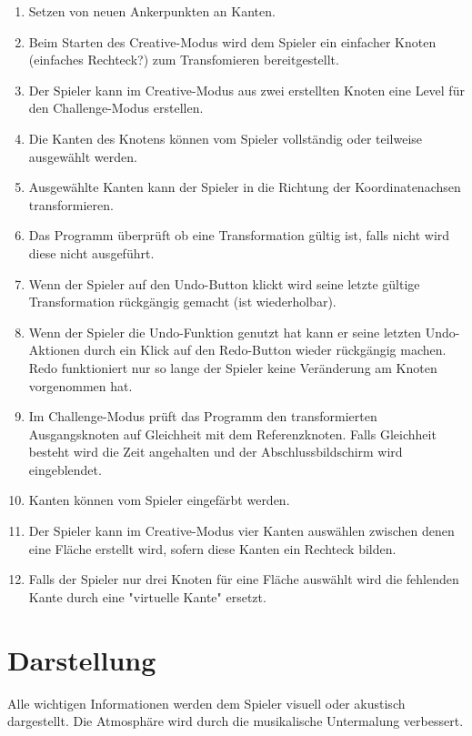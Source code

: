 \begin{enumerate}[resume]
\item Setzen von neuen Ankerpunkten an Kanten. %
\item Beim Starten des Creative-Modus wird dem Spieler ein einfacher Knoten (einfaches Rechteck?) zum Transfomieren bereitgestellt.
\item Der Spieler kann im Creative-Modus aus zwei erstellten Knoten eine Level für den Challenge-Modus erstellen.
\item Die Kanten des Knotens können vom Spieler vollständig oder teilweise ausgewählt werden.
\item Ausgewählte Kanten kann der Spieler in die Richtung der Koordinatenachsen transformieren.
\item Das Programm überprüft ob eine Transformation gültig ist, falls nicht wird diese nicht ausgeführt.
\item Wenn der Spieler auf den Undo-Button klickt wird seine letzte gültige Transformation rückgängig gemacht (ist wiederholbar).
\item Wenn der Spieler die Undo-Funktion genutzt hat kann er seine letzten Undo-Aktionen durch ein Klick auf den Redo-Button wieder rückgängig machen. Redo funktioniert nur so lange der Spieler keine Veränderung am Knoten vorgenommen hat.
\item Im Challenge-Modus prüft das Programm den transformierten Ausgangsknoten auf Gleichheit mit dem Referenzknoten. Falls Gleichheit besteht wird die Zeit angehalten und der Abschlussbildschirm wird eingeblendet.
\item Kanten können vom Spieler eingefärbt werden.
\item Der Spieler kann im Creative-Modus vier Kanten auswählen zwischen denen eine Fläche erstellt wird, sofern diese Kanten ein Rechteck bilden.
\item Falls der Spieler nur drei Knoten für eine Fläche auswählt wird  die fehlenden Kante durch eine "virtuelle Kante" ersetzt.

\end{enumerate}

\section{Darstellung}
Alle wichtigen Informationen werden dem Spieler visuell oder akustisch dargestellt. Die Atmosphäre wird durch die musikalische Untermalung verbessert.

